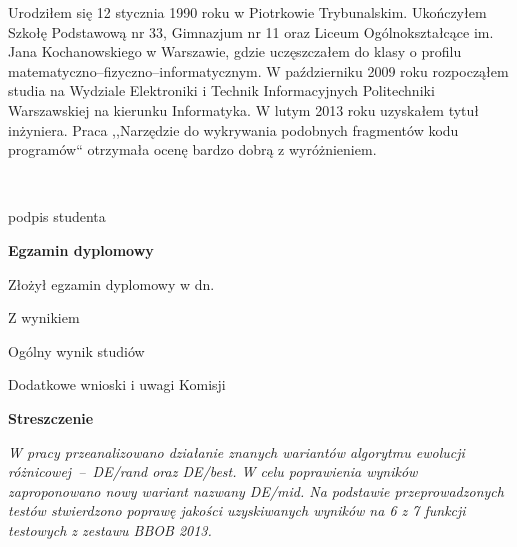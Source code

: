 \begin{titlepage}
    \indent
Urodziłem się 12 stycznia 1990 roku w Piotrkowie Trybunalskim. Ukończyłem Szkołę Podstawową
nr 33, Gimnazjum nr 11 oraz Liceum Ogólnokształcące im. Jana Kochanowskiego w Warszawie, gdzie
uczęszczałem do klasy o profilu matematyczno--fizyczno--informatycznym.
W październiku 2009 roku rozpocząłem studia na Wydziale Elektroniki i Technik Informacyjnych
Politechniki Warszawskiej na kierunku Informatyka. W lutym 2013 roku uzyskałem tytuł inżyniera.
Praca ,,Narzędzie do wykrywania podobnych fragmentów kodu programów`` otrzymała ocenę bardzo dobrą
z wyróżnieniem.

    \par
    \vspace{2\baselineskip}
    \hfill\parbox{15em}{{\small\dotfill}\\[-.3ex]
    \centerline{\footnotesize podpis studenta}}\par
    \vspace{2\baselineskip}
    \begin{center}
 	{\large\bfseries Egzamin dyplomowy} \par\bigskip
    \end{center}
    \par\noindent\vspace{1\baselineskip}
    Złożył egzamin dyplomowy w dn. \dotfill
    \par\noindent\vspace{1\baselineskip}
    Z wynikiem \dotfill
    \par\noindent\vspace{1\baselineskip}
    Ogólny wynik studiów \dotfill
    \par\noindent\vspace{1\baselineskip}
    Dodatkowe wnioski i uwagi Komisji \dotfill
  
    \newpage\thispagestyle{empty}
    \vspace*{2\baselineskip}
    \begin{center}
	{\large\bfseries Streszczenie}\par\bigskip
    \end{center}

    {\itshape
W pracy przeanalizowano działanie znanych wariantów algorytmu ewolucji różnicowej~--~DE/rand
oraz DE/best. W celu poprawienia wyników zaproponowano nowy wariant nazwany DE/mid. 
Na podstawie przeprowadzonych testów stwierdzono poprawę jakości uzyskiwanych wyników na 6 z 7 
funkcji testowych z zestawu BBOB 2013.}
    \vspace*{1\baselineskip}


\end{titlepage}
